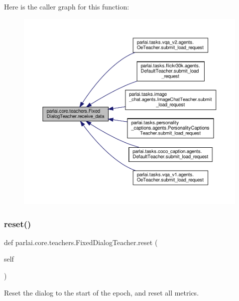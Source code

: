 Here is the caller graph for this function\+:
\nopagebreak
\begin{figure}[H]
\begin{center}
\leavevmode
\includegraphics[width=350pt]{classparlai_1_1core_1_1teachers_1_1FixedDialogTeacher_a001ed7924490d0e291588c54d383384a_icgraph}
\end{center}
\end{figure}
\mbox{\label{classparlai_1_1core_1_1teachers_1_1FixedDialogTeacher_af0e1160f17d43ace896f71c190e4e5ec}} 
\subsubsection{\texorpdfstring{reset()}{reset()}}
{\footnotesize\ttfamily def parlai.\+core.\+teachers.\+Fixed\+Dialog\+Teacher.\+reset (\begin{DoxyParamCaption}\item[{}]{self }\end{DoxyParamCaption})}

\begin{DoxyVerb}Reset the dialog to the start of the epoch, and reset all metrics.\end{DoxyVerb}
 


